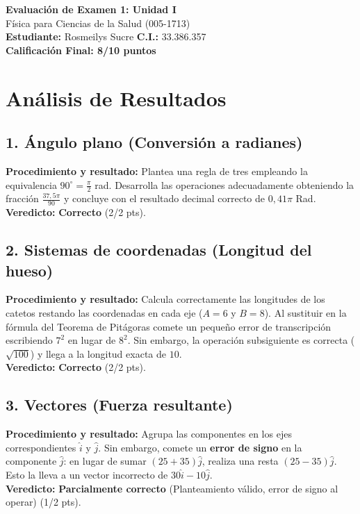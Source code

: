 \documentclass[12pt]{article}
\begin{document}
\begin{center}
    \Large \textbf{Evaluación de Examen 1: Unidad I} \\
    \large Física para Ciencias de la Salud (005-1713) \\
    \vspace{0.5cm}
    \textbf{Estudiante:} Rosmeilys Sucre \quad \textbf{C.I.:} 33.386.357
    \vspace{0.3cm} \\
    \large \textbf{Calificación Final: 8/10 puntos}
\end{center}

\vspace{0.5cm}

\section*{Análisis de Resultados}

\subsection*{1. Ángulo plano (Conversión a radianes)}
\textbf{Procedimiento y resultado:} Plantea una regla de tres empleando la equivalencia $90^\circ = \frac{\pi}{2}$ rad. Desarrolla las operaciones adecuadamente obteniendo la fracción $\frac{37,5\pi}{90}$ y concluye con el resultado decimal correcto de $0,41\pi$ Rad. \\
\textbf{Veredicto:} \textbf{Correcto} (2/2 pts).

\subsection*{2. Sistemas de coordenadas (Longitud del hueso)}
\textbf{Procedimiento y resultado:} Calcula correctamente las longitudes de los catetos restando las coordenadas en cada eje ($A=6$ y $B=8$). Al sustituir en la fórmula del Teorema de Pitágoras comete un pequeño error de transcripción escribiendo $7^2$ en lugar de $8^2$. Sin embargo, la operación subsiguiente es correcta ($\sqrt{100}$) y llega a la longitud exacta de $10$. \\
\textbf{Veredicto:} \textbf{Correcto} (2/2 pts).

\subsection*{3. Vectores (Fuerza resultante)}
\textbf{Procedimiento y resultado:} Agrupa las componentes en los ejes correspondientes $\hat{i}$ y $\hat{j}$. Sin embargo, comete un \textbf{error de signo} en la componente $\hat{j}$: en lugar de sumar $(25 + 35)\hat{j}$, realiza una resta $(25 - 35)\hat{j}$. Esto la lleva a un vector incorrecto de $30\hat{i} - 10\hat{j}$. \\
\textbf{Veredicto:} \textbf{Parcialmente correcto} (Planteamiento válido, error de signo al operar) (1/2 pts).
\end{document}
